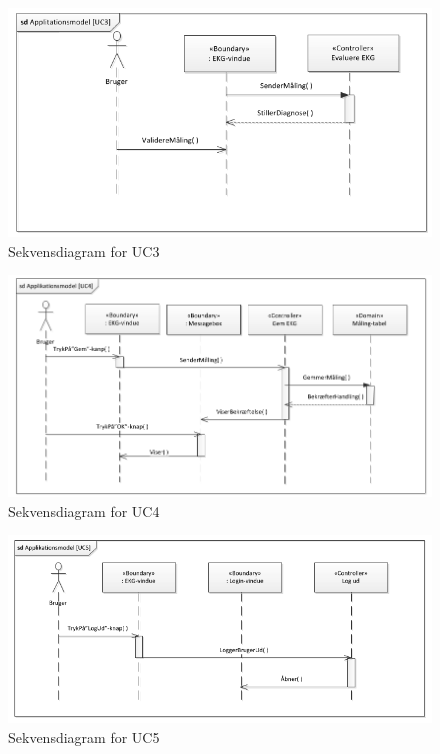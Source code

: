 \begin{figure}[H]
	\centering
	\includegraphics[width=1\textwidth]{Figurer/Snip20150429_31}
	\caption{Sekvensdiagram for UC3}
\end{figure}

\begin{figure}[H]
	\centering
	\includegraphics[width=1\textwidth]{Figurer/Snip20150429_28}
	\caption{Sekvensdiagram for UC4}
\end{figure}

\begin{figure}[H]
	\centering
	\includegraphics[width=1\textwidth]{Figurer/Snip20150429_30}
	\caption{Sekvensdiagram for UC5}
\end{figure}

